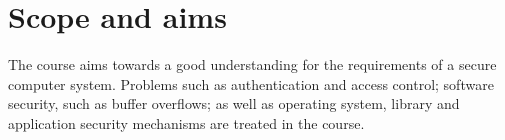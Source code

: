 \mode*

\section{Scope and aims}%
\label{sec:aim}


The course aims towards a good understanding for the requirements of a secure 
computer system.
Problems such as authentication and access control; software security, such as 
buffer overflows; as well as operating system, library and application security 
mechanisms are treated in the course.


